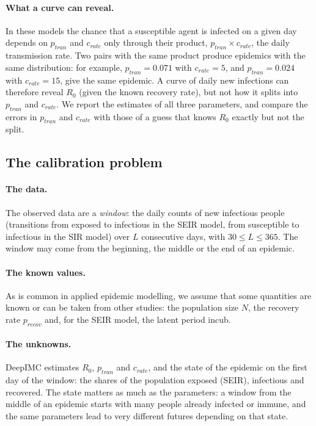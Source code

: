 \documentclass[12pt]{article}
\begin{document}
\paragraph{What a curve can reveal.} In these models the chance that a susceptible agent is infected
on a given day depends on $p_{tran}$ and $c_{rate}$ only through their product, $p_{tran} \times
c_{rate}$, the daily transmission rate. Two pairs with the same product produce epidemics with the
same distribution: for example, $p_{tran} = 0.071$ with $c_{rate} = 5$, and $p_{tran} = 0.024$ with
$c_{rate} = 15$, give the same epidemic. A curve of daily new infections can therefore reveal $R_0$
(given the known recovery rate), but not how it splits into $p_{tran}$ and $c_{rate}$. We report the
estimates of all three parameters, and compare the errors in $p_{tran}$ and $c_{rate}$ with those of
a guess that knows $R_0$ exactly but not the split.

\subsection{The calibration problem}\label{sec:problem}

\paragraph{The data.} The observed data are a \emph{window}: the daily counts of new infectious
people (transitions from exposed to infectious in the SEIR model, from susceptible to infectious in
the SIR model) over $L$ consecutive days, with $30 \le L \le 365$. The window may come from the
beginning, the middle or the end of an epidemic.

\paragraph{The known values.} As is common in applied epidemic modelling, we assume that some
quantities are known or can be taken from other studies: the population size $N$, the recovery rate
$p_{recov}$ and, for the SEIR model, the latent period incub.

\paragraph{The unknowns.} DeepIMC estimates $R_0$, $p_{tran}$ and $c_{rate}$, and the state of the
epidemic on the first day of the window: the shares of the population exposed (SEIR), infectious and
recovered. The state matters as much as the parameters: a window from the middle of an epidemic
starts with many people already infected or immune, and the same parameters lead to very different
futures depending on that state.
\end{document}

